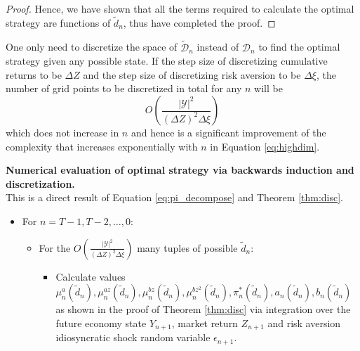 \begin{proof}
Hence, we have shown that all the terms required to calculate the optimal strategy are functions of $\tilde d_n$, thus have completed the proof.

\end{proof}

\begin{corollary} One only need to discretize the space of $\tilde{\mathcal D}_n$ instead of $\mathcal D_n$ to find the optimal strategy given any possible state. If the step size of discretizing cumulative returns to be $\Delta Z$ and the step size of discretizing risk aversion to be $\Delta\xi$, the number of grid points to be discretized in total for any $n$ will be\begin{equation}\label{eq:lowdim}
    O\left(\frac{|\mathcal Y|^2}{(\Delta Z)^2\Delta\xi}\right)
\end{equation} which does not increase in $n$ and hence is a significant improvement of the complexity that increases exponentially with $n$ in Equation \eqref{eq:highdim}.
\end{corollary}

\begin{algorithm}[t]
  \caption{\textbf{Numerical evaluation of optimal strategy via backwards induction and discretization.}\\
  This is a direct result of Equation \eqref{eq:pi_decompose} and Theorem \ref{thm:disc}.}
  \label{alg2}
  \begin{spacing}{1.15}
\begin{itemize}
    \item For $n=T-1,T-2,\ldots,0$:
    \begin{itemize}
        \item For the $O\left(\frac{|\mathcal Y|^2}{(\Delta Z)^2\Delta\xi}\right)$ many tuples of possible $\tilde d_n$:\begin{itemize}
            \item Calculate values $\mu^a_{n}(\tilde d_n),\mu^{az}_{n}(\tilde d_n),\mu^{bz}_{n}(\tilde d_n),\mu^{bz^2}_{n}(\tilde d_n),\pi_n^*(\tilde d_n),a_n(\tilde d_n),b_n(\tilde d_n)$ as shown in the proof of Theorem \ref{thm:disc} via integration over the future economy state $Y_{n+1}$, market return $Z_{n+1}$ and risk aversion idiosyncratic shock random variable $\epsilon_{n+1}$.
        \end{itemize}
    \end{itemize}
\end{itemize}
  \end{spacing}
\end{algorithm}

